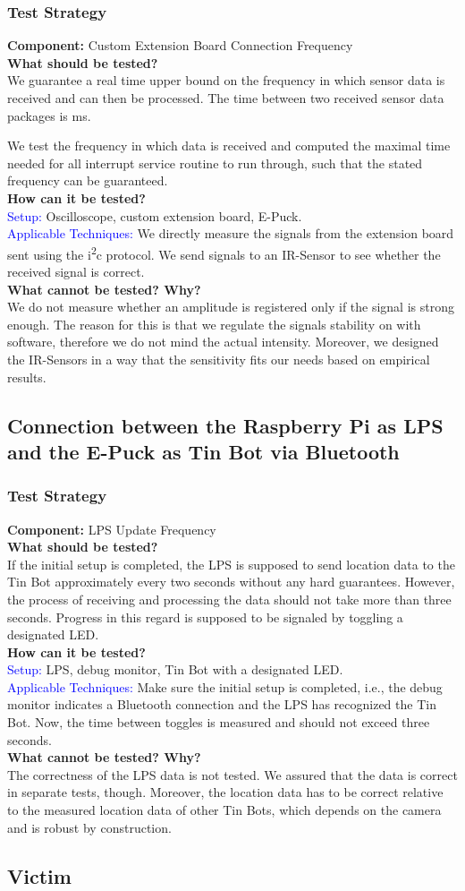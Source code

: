 \documentclass[a4paper,parskip,headheight=38pt]{scrartcl} %
\newcommand{\teststrat}[5]{
    \subsubsection{Test Strategy}
	\textbf{Component:} #1 \\
	\noindent\textbf{What should be tested?} \\
    \noindent #2 \\
	\noindent\textbf{How can it be tested?} \\
    \noindent\textcolor{blue}{Setup:} #3 \\
    \noindent\textcolor{blue}{Applicable Techniques:} #4 \\
	\noindent\textbf{What cannot be tested? Why?} \\
    \noindent #5
}
\newcommand{\ie}{i.e.}
\begin{document}
\teststrat{Custom Extension Board Connection Frequency}{
    We guarantee a real time upper bound on the frequency in which sensor data
    is received and can then be processed. The time between two received
    sensor data packages is \todo[inline]{FREQUENCY}ms.

    We test the frequency in which data is received and computed the maximal
    time needed for all interrupt service routine to run through, such that the
    stated frequency can be guaranteed.
}{
    Oscilloscope, custom extension board, E-Puck.
}{
    We directly measure the signals from the extension board sent using the
    i\textsuperscript{2}c protocol. We send signals to an IR-Sensor to see
    whether the received signal is correct.
}{
   We do not measure whether an amplitude is registered only if the signal is
   strong enough. The reason for this is that we regulate the signals stability
   on with software, therefore we do not mind the actual intensity. Moreover, we
   designed the IR-Sensors in a way that the sensitivity fits our needs based on
   empirical results.
}

\subsection{Connection between the Raspberry Pi as LPS and the E-Puck as Tin Bot
via Bluetooth}

\teststrat{LPS Update Frequency}{
    If the initial setup is completed, the LPS is supposed to send location data
    to the Tin Bot approximately every two seconds without any hard guarantees.
    However, the process of receiving and processing the data should not take
    more than three seconds. Progress in this regard is supposed to be signaled
    by toggling a designated LED.
}{
    LPS, debug monitor, Tin Bot with a designated LED.
}{
    Make sure the initial setup is completed, \ie, the debug monitor indicates a
    Bluetooth connection and the LPS has recognized the Tin Bot. Now, the time
    between toggles is measured and should not exceed three seconds.
}{
    The correctness of the LPS data is not tested. We assured that the data is
    correct in separate tests, though. Moreover, the location data has to be
    correct relative to the measured location data of other Tin Bots, which
    depends on the camera and is robust by construction.
}

\subsection{Victim}
\end{document}
